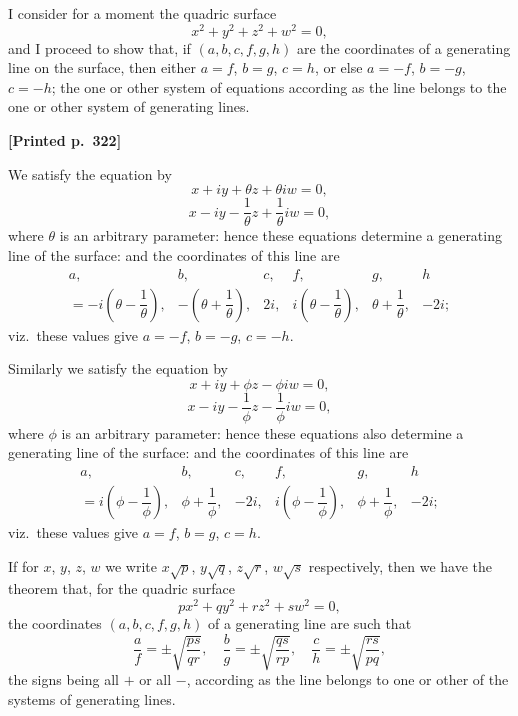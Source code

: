 \documentclass[11pt]{article}
\begin{document}
I consider for a moment the quadric surface
\[
x^{2} + y^{2} + z^{2} + w^{2} = 0,
\]
and I proceed to show that, if $(a, b, c, f, g, h)$ are the coordinates of a generating line on the surface, then either $a = f$, $b = g$, $c = h$, or else $a = -f$, $b = -g$, $c = -h$; the one or other system of equations according as the line belongs to the one or other system of generating lines.

\medskip

\noindent\textbf{[Printed p.~322]}\hfill

We satisfy the equation by
\[
x + iy + \theta z + \theta iw = 0,
\]
\[
x - iy - \frac{1}{\theta}z + \frac{1}{\theta}iw = 0,
\]
where $\theta$ is an arbitrary parameter: hence these equations determine a generating line of the surface: and the coordinates of this line are
\[
\begin{array}{cccccc}
a, & b, & c, & f, & g, & h \\
= -i\!\left(\theta - \dfrac{1}{\theta}\right), & -\!\left(\theta + \dfrac{1}{\theta}\right), & 2i, & i\!\left(\theta - \dfrac{1}{\theta}\right), & \theta + \dfrac{1}{\theta}, & -2i;
\end{array}
\]
viz.\ these values give $a = -f$, $b = -g$, $c = -h$.

\medskip

Similarly we satisfy the equation by
\[
x + iy + \phi z - \phi iw = 0,
\]
\[
x - iy - \frac{1}{\phi}z - \frac{1}{\phi}iw = 0,
\]
where $\phi$ is an arbitrary parameter: hence these equations also determine a generating line of the surface: and the coordinates of this line are
\[
\begin{array}{cccccc}
a, & b, & c, & f, & g, & h \\
= i\!\left(\phi - \dfrac{1}{\phi}\right), & \phi + \dfrac{1}{\phi}, & -2i, & i\!\left(\phi - \dfrac{1}{\phi}\right), & \phi + \dfrac{1}{\phi}, & -2i;
\end{array}
\]
viz.\ these values give $a = f$, $b = g$, $c = h$.

\medskip

If for $x$, $y$, $z$, $w$ we write $x\sqrt{p}$, $y\sqrt{q}$, $z\sqrt{r}$, $w\sqrt{s}$ respectively, then we have the theorem that, for the quadric surface
\[
p x^{2} + q y^{2} + r z^{2} + s w^{2} = 0,
\]
the coordinates $(a, b, c, f, g, h)$ of a generating line are such that
\[
\frac{a}{f} = \pm\sqrt{\frac{ps}{qr}},\quad \frac{b}{g} = \pm\sqrt{\frac{qs}{rp}},\quad \frac{c}{h} = \pm\sqrt{\frac{rs}{pq}},
\]
the signs being all $+$ or all $-$, according as the line belongs to one or other of the systems of generating lines.
\end{document}
